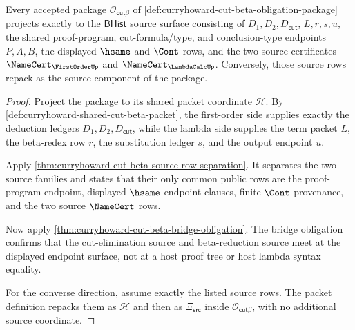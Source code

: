 \begin{theorem}
\label{thm:curryhoward-cut-beta-source-obligation-surface}
Every accepted package
$\mathcal{O}_{\mathsf{cut}\beta}$ of
\autoref{def:curryhoward-cut-beta-obligation-package} projects exactly to the
$\mathsf{BHist}$ source surface consisting of $D_1,D_2,D_{\mathsf{cut}}$,
$L,r,s,u$, the shared proof-program, cut-formula/type, and conclusion-type
endpoints $P,A,B$, the displayed $\hsame$ and $\Cont$ rows, and the two source
certificates $\NameCert_{\FirstOrderUp}$ and $\NameCert_{\LambdaCalcUp}$.
Conversely, those source rows repack as the source component of the package.
\end{theorem}
\begin{proof}
Project the package to its shared packet coordinate $\mathcal H$. By
\autoref{def:curryhoward-shared-cut-beta-packet}, the first-order side supplies
exactly the deduction ledgers $D_1,D_2,D_{\mathsf{cut}}$, while the lambda side
supplies the term packet $L$, the beta-redex row $r$, the substitution ledger
$s$, and the output endpoint $u$.

Apply \autoref{thm:curryhoward-cut-beta-source-row-separation}. It separates
the two source families and states that their only common public rows are the
proof-program endpoint, displayed $\hsame$ endpoint clauses, finite $\Cont$
provenance, and the two source $\NameCert$ rows.

Now apply \autoref{thm:curryhoward-cut-beta-bridge-obligation}. The bridge
obligation confirms that the cut-elimination source and beta-reduction source
meet at the displayed endpoint surface, not at a host proof tree or host lambda
syntax equality.

For the converse direction, assume exactly the listed source rows. The packet
definition repacks them as $\mathcal H$ and then as
$\Xi_{\mathsf{src}}$ inside
$\mathcal{O}_{\mathsf{cut}\beta}$, with no additional source coordinate.
\end{proof}


